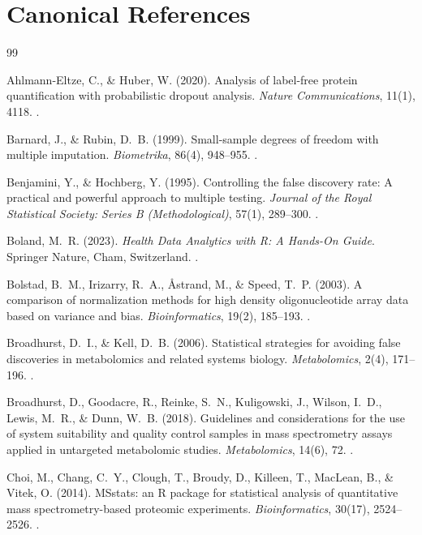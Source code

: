 \documentclass[11pt,oneside]{book}
\begin{document}
\section*{Canonical References}

\begin{thebibliography}{99}

Ahlmann-Eltze, C., \& Huber, W. (2020). Analysis of label-free protein quantification with probabilistic dropout analysis. \textit{Nature Communications}, 11(1), 4118. .

Barnard, J., \& Rubin, D.~B. (1999). Small-sample degrees of freedom with multiple imputation. \textit{Biometrika}, 86(4), 948--955. .

Benjamini, Y., \& Hochberg, Y. (1995). Controlling the false discovery rate: A practical and powerful approach to multiple testing. \textit{Journal of the Royal Statistical Society: Series B (Methodological)}, 57(1), 289--300. .

Boland, M.~R. (2023). \textit{Health Data Analytics with R: A Hands-On Guide}. Springer Nature, Cham, Switzerland. .

Bolstad, B.~M., Irizarry, R.~A., {\AA}strand, M., \& Speed, T.~P. (2003). A comparison of normalization methods for high density oligonucleotide array data based on variance and bias. \textit{Bioinformatics}, 19(2), 185--193. .

Broadhurst, D.~I., \& Kell, D.~B. (2006). Statistical strategies for avoiding false discoveries in metabolomics and related systems biology. \textit{Metabolomics}, 2(4), 171--196. .

Broadhurst, D., Goodacre, R., Reinke, S.~N., Kuligowski, J., Wilson, I.~D., Lewis, M.~R., \& Dunn, W.~B. (2018). Guidelines and considerations for the use of system suitability and quality control samples in mass spectrometry assays applied in untargeted metabolomic studies. \textit{Metabolomics}, 14(6), 72. .

Choi, M., Chang, C.~Y., Clough, T., Broudy, D., Killeen, T., MacLean, B., \& Vitek, O. (2014). MSstats: an R package for statistical analysis of quantitative mass spectrometry-based proteomic experiments. \textit{Bioinformatics}, 30(17), 2524--2526. .


\end{thebibliography}
\end{document}
